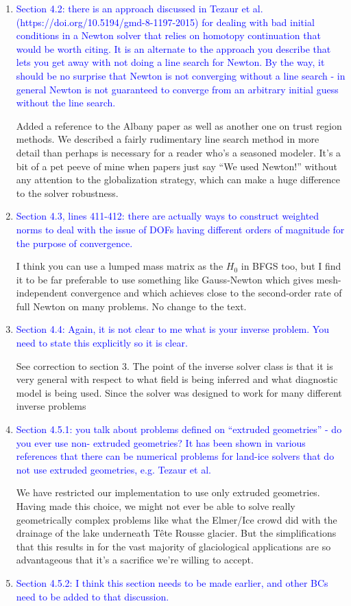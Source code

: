 \documentclass{article}
\theoremstyle{definition}
\theoremstyle{plain}
\begin{document}
\begin{enumerate}
\item \textcolor{blue}{Section 4.2: there is an approach discussed in Tezaur et al. (https://doi.org/10.5194/gmd-8-1197-2015)
for dealing with bad initial conditions in a Newton solver that relies on homotopy continuation that
would be worth citing. It is an alternate to the approach you describe that lets you get away with not
doing a line search for Newton. By the way, it should be no surprise that Newton is not converging
without a line search - in general Newton is not guaranteed to converge from an arbitrary initial
guess without the line search.}

Added a reference to the Albany paper as well as another one on trust region methods.
We described a fairly rudimentary line search method in more detail than perhaps is necessary for a reader who's a seasoned modeler.
It's a bit of a pet peeve of mine when papers just say ``We used Newton!'' without any attention to the globalization strategy, which can make a huge difference to the solver robustness.
\item \textcolor{blue}{Section 4.3, lines 411-412: there are actually ways to construct weighted norms to deal with the issue
of DOFs having different orders of magnitude for the purpose of convergence.}

I think you can use a lumped mass matrix as the $H_0$ in BFGS too, but I find it to be far preferable to use something like Gauss-Newton which gives mesh-independent convergence and which achieves close to the second-order rate of full Newton on many problems.
No change to the text.
\item \textcolor{blue}{Section 4.4: Again, it is not clear to me what is your inverse problem. You need to state this explicitly
so it is clear.}

See correction to section 3.
The point of the inverse solver class is that it is very general with respect to what field is being inferred and what diagnostic model is being used.
Since the solver was designed to work for many different inverse problems
\item \textcolor{blue}{Section 4.5.1: you talk about problems defined on ``extruded geometries'' - do you ever use non-
extruded geometries? It has been shown in various references that there can be numerical problems
for land-ice solvers that do not use extruded geometries, e.g. Tezaur et al.}

We have restricted our implementation to use only extruded geometries.
Having made this choice, we might not ever be able to solve really geometrically complex problems like what the Elmer/Ice crowd did with the drainage of the lake underneath T\^ete Rousse glacier.
But the simplifications that this results in for the vast majority of glaciological applications are so advantageous that it's a sacrifice we're willing to accept.
\item \textcolor{blue}{Section 4.5.2: I think this section needs to be made earlier, and other BCs need to be added to that
discussion.}


\end{enumerate}
\end{document}
